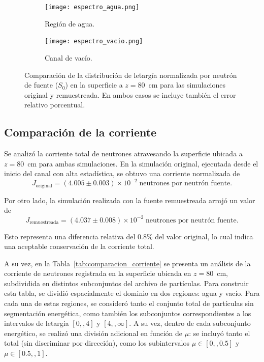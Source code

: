 \begin{figure}[H]
    \centering
    \begin{subfigure}[t]{0.48\textwidth}
        \centering
        \texttt{[image: espectro\_agua.png]}
        \caption{Región de agua.}
        \label{fig:espectro_agua}
    \end{subfigure}
    \hfill
    \begin{subfigure}[t]{0.48\textwidth}
        \centering
        \texttt{[image: espectro\_vacio.png]}
        \caption{Canal de vacío.}
        \label{fig:espectro_vacio}
    \end{subfigure}
    \caption{Comparación de la distribución de letargía normalizada por neutrón de fuente ($S_0$) en la superficie a $z = 80$~cm para las simulaciones original y remuestreada. En ambos casos se incluye también el error relativo porcentual.}
    \label{fig:espectro_comparacion}
\end{figure}

\subsection{Comparación de la corriente}

Se analizó la corriente total de neutrones atravesando la superficie ubicada a $z = 80$~cm para ambas simulaciones. En la simulación original, ejecutada desde el inicio del canal con alta estadística, se obtuvo una corriente normalizada de
\[
J_{\text{original}} = (4.005 \pm 0.003) \times 10^{-2} \; \text{neutrones por neutrón fuente}.
\]

Por otro lado, la simulación realizada con la fuente remuestreada arrojó un valor de
\[
J_{\text{remuestreada}} = (4.037 \pm 0.008) \times 10^{-2} \; \text{neutrones por neutrón fuente}.
\]

Esto representa una diferencia relativa del 0.8\% del valor original, lo cual indica una aceptable conservación de la corriente total. 

A su vez, en la Tabla~\ref{tab:comparacion_corriente} se presenta un análisis de la corriente de neutrones registrada en la superficie ubicada en $z = 80$~cm, subdividida en distintos subconjuntos del archivo de partículas. Para construir esta tabla, se dividió espacialmente el dominio en dos regiones: agua y vacío. Para cada una de estas regiones, se consideró tanto el conjunto total de partículas sin segmentación energética, como también los subconjuntos correspondientes a los intervalos de letargia $[0,,4]$ y $[4,,\infty]$. A su vez, dentro de cada subconjunto energético, se realizó una división adicional en función de $\mu$: se incluyó tanto el total (sin discriminar por dirección), como los subintervalos $\mu \in [0,,0.5]$ y $\mu \in [0.5,,1]$.

